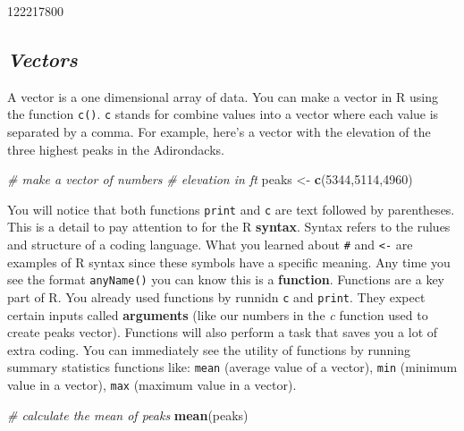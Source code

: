 \documentclass[
]{book}
\newenvironment{Shaded}{\begin{snugshade}}{\end{snugshade}}
\newcommand{\CommentTok}[1]{\textcolor[rgb]{0.56,0.35,0.01}{\textit{#1}}}
\newcommand{\DecValTok}[1]{\textcolor[rgb]{0.00,0.00,0.81}{#1}}
\newcommand{\FunctionTok}[1]{\textcolor[rgb]{0.13,0.29,0.53}{\textbf{#1}}}
\newcommand{\NormalTok}[1]{#1}
\newcommand{\OtherTok}[1]{\textcolor[rgb]{0.56,0.35,0.01}{#1}}
\theoremstyle{definition}
\theoremstyle{definition}
\theoremstyle{definition}
\theoremstyle{definition}
\theoremstyle{remark}
\begin{document}
\begin{Shaded}
\begin{Highlighting}[]
\NormalTok{[1] 122217800}
\end{Highlighting}
\end{Shaded}

\hypertarget{vectors}{%
\subsection{\texorpdfstring{\emph{Vectors}}{Vectors}}\label{vectors}}

A vector is a one dimensional array of data. You can make a vector in R using the function \texttt{c()}. \texttt{c} stands for combine values into a vector where each value is separated by a comma. For example, here's a vector with the elevation of the three highest peaks in the Adirondacks.

\begin{Shaded}
\begin{Highlighting}[]
\CommentTok{\# make a vector of numbers}
\CommentTok{\# elevation in ft}
\NormalTok{peaks }\OtherTok{\textless{}{-}} \FunctionTok{c}\NormalTok{(}\DecValTok{5344}\NormalTok{,}\DecValTok{5114}\NormalTok{,}\DecValTok{4960}\NormalTok{)}
\end{Highlighting}
\end{Shaded}

You will notice that both functions \texttt{print} and \texttt{c} are text followed by parentheses. This is a detail to pay attention to for the R \textbf{syntax}. Syntax refers to the rulues and structure of a coding language. What you learned about \texttt{\#} and \texttt{\textless{}-} are examples of R syntax since these symbols have a specific meaning. Any time you see the format \texttt{anyName()} you can know this is a \textbf{function}. Functions are a key part of R. You already used functions by runnidn \texttt{c} and \texttt{print}. They expect certain inputs called \textbf{arguments} (like our numbers in the \emph{c} function used to create peaks vector). Functions will also perform a task that saves you a lot of extra coding. You can immediately see the utility of functions by running summary statistics functions like: \texttt{mean} (average value of a vector), \texttt{min} (minimum value in a vector), \texttt{max} (maximum value in a vector).

\begin{Shaded}
\begin{Highlighting}[]
\CommentTok{\# calculate the mean of peaks}
\FunctionTok{mean}\NormalTok{(peaks)}
\end{Highlighting}
\end{Shaded}
\end{document}

